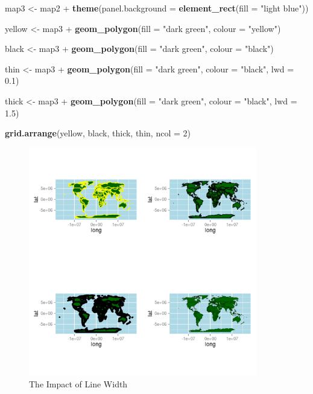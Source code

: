 \documentclass[]{article}
\newenvironment{Shaded}{}{}
\newcommand{\KeywordTok}[1]{\textcolor[rgb]{0.00,0.44,0.13}{\textbf{{#1}}}}
\newcommand{\DataTypeTok}[1]{\textcolor[rgb]{0.56,0.13,0.00}{{#1}}}
\newcommand{\DecValTok}[1]{\textcolor[rgb]{0.25,0.63,0.44}{{#1}}}
\newcommand{\FloatTok}[1]{\textcolor[rgb]{0.25,0.63,0.44}{{#1}}}
\newcommand{\StringTok}[1]{\textcolor[rgb]{0.25,0.44,0.63}{{#1}}}
\newcommand{\NormalTok}[1]{{#1}}
\let\Oldincludegraphics\includegraphics
\renewcommand{\includegraphics}[1]{\Oldincludegraphics[width=10cm]{#1}}
\begin{document}
\begin{Shaded}
\begin{Highlighting}[]
\NormalTok{map3 <- map2 + }\KeywordTok{theme}\NormalTok{(}\DataTypeTok{panel.background =} \KeywordTok{element_rect}\NormalTok{(}\DataTypeTok{fill =} \StringTok{"light blue"}\NormalTok{))}

\NormalTok{yellow <- map3 + }\KeywordTok{geom_polygon}\NormalTok{(}\DataTypeTok{fill =} \StringTok{"dark green"}\NormalTok{, }\DataTypeTok{colour =} \StringTok{"yellow"}\NormalTok{)}

\NormalTok{black <- map3 + }\KeywordTok{geom_polygon}\NormalTok{(}\DataTypeTok{fill =} \StringTok{"dark green"}\NormalTok{, }\DataTypeTok{colour =} \StringTok{"black"}\NormalTok{)}

\NormalTok{thin <- map3 + }\KeywordTok{geom_polygon}\NormalTok{(}\DataTypeTok{fill =} \StringTok{"dark green"}\NormalTok{, }\DataTypeTok{colour =} \StringTok{"black"}\NormalTok{, }\DataTypeTok{lwd =} \FloatTok{0.1}\NormalTok{)}

\NormalTok{thick <- map3 + }\KeywordTok{geom_polygon}\NormalTok{(}\DataTypeTok{fill =} \StringTok{"dark green"}\NormalTok{, }\DataTypeTok{colour =} \StringTok{"black"}\NormalTok{, }\DataTypeTok{lwd =} \FloatTok{1.5}\NormalTok{)}

\KeywordTok{grid.arrange}\NormalTok{(yellow, black, thick, thin, }\DataTypeTok{ncol =} \DecValTok{2}\NormalTok{)}
\end{Highlighting}
\end{Shaded}
\begin{figure}[htbp]
\centering
\includegraphics{figure/The_Impact_of_Line_Width.png}
\caption{The Impact of Line Width}
\end{figure}
\end{document}

